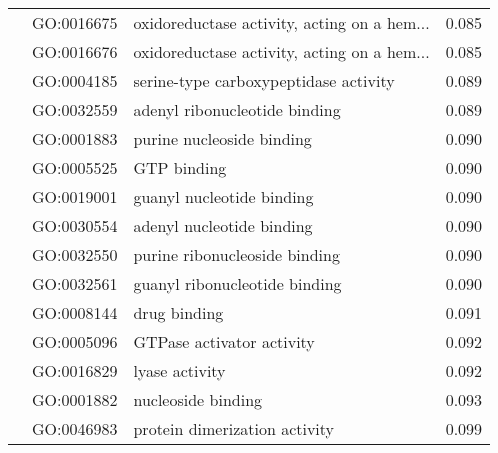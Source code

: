 \begin{longtable}{lllr}
   & GO:0016675 &  oxidoreductase activity, acting on a hem... &         0.085 \\
   & GO:0016676 &  oxidoreductase activity, acting on a hem... &         0.085 \\
   & GO:0004185 &        serine-type carboxypeptidase activity &         0.089 \\
   & GO:0032559 &                adenyl ribonucleotide binding &         0.089 \\
   & GO:0001883 &                    purine nucleoside binding &         0.090 \\
   & GO:0005525 &                                  GTP binding &         0.090 \\
   & GO:0019001 &                    guanyl nucleotide binding &         0.090 \\
   & GO:0030554 &                    adenyl nucleotide binding &         0.090 \\
   & GO:0032550 &                purine ribonucleoside binding &         0.090 \\
   & GO:0032561 &                guanyl ribonucleotide binding &         0.090 \\
   & GO:0008144 &                                 drug binding &         0.091 \\
   & GO:0005096 &                    GTPase activator activity &         0.092 \\
   & GO:0016829 &                               lyase activity &         0.092 \\
   & GO:0001882 &                           nucleoside binding &         0.093 \\
   & GO:0046983 &                protein dimerization activity &         0.099 \\
\end{longtable}
